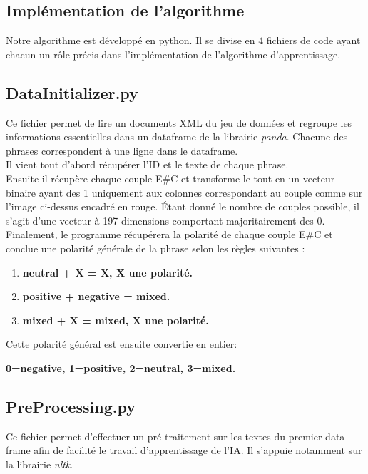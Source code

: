 \documentclass[12pt ,a4paper ]{article}
\begin{document}
\begin{multicols}{2}
\section{Implémentation de l'algorithme}
Notre algorithme est développé en python. Il se divise en 4 fichiers de code ayant chacun un rôle précis dans l'implémentation de l'algorithme d'apprentissage. 

\subsection{DataInitializer.py}
Ce fichier permet de lire un documents XML du jeu de données et regroupe les informations essentielles dans un dataframe de la librairie \textit{panda}. Chacune des phrases correspondent à une ligne dans le dataframe. \\

\noindent Il vient tout d'abord récupérer l'ID et le texte de chaque phrase. \\

\noindent Ensuite il récupère chaque couple E\#C et transforme le tout en un vecteur binaire ayant des 1 uniquement aux colonnes correspondant au couple comme sur l'image ci-dessus encadré en rouge. Étant donné le nombre de couples possible, il s'agit d'une vecteur à 197 dimensions comportant majoritairement des 0.\\

\noindent Finalement, le programme récupérera la polarité de chaque couple E\#C et conclue une polarité générale de la phrase selon les règles suivantes :
\begin{enumerate}
\item \textbf{\small{neutral + X = X, X une polarité. }}
\item \textbf{\small{positive + negative = mixed.}}
\item \textbf{\small{mixed + X = mixed, X une polarité.}}
\end{enumerate}

\noindent Cette polarité général est ensuite convertie en entier:

\noindent \textbf{0=negative, 1=positive, 2=neutral, 3=mixed.}

\subsection{PreProcessing.py}
Ce fichier permet d'effectuer un pré traitement sur les textes du premier data frame afin de facilité le travail d'apprentissage de l'IA. Il s'appuie notamment sur la librairie \textit{nltk}.\\


\end{multicols}
\end{document}
